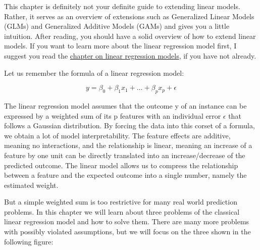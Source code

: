 \documentclass[12pt,]{krantz}
\begin{document}
This chapter is definitely not your definite guide to extending linear
models. Rather, it serves as an overview of extensions such as
Generalized Linear Models (GLMs) and Generalized Additive Models (GAMs)
and gives you a little intuition. After reading, you should have a solid
overview of how to extend linear models. If you want to learn more about
the linear regression model first, I suggest you read the
\protect\hyperlink{limo}{chapter on linear regression models}, if you
have not already.

Let us remember the formula of a linear regression model:

\[y=\beta_{0}+\beta_{1}x_{1}+\ldots+\beta_{p}x_{p}+\epsilon\]

The linear regression model assumes that the outcome y of an instance
can be expressed by a weighted sum of its p features with an individual
error \(\epsilon\) that follows a Gaussian distribution. By forcing the
data into this corset of a formula, we obtain a lot of model
interpretability. The feature effects are additive, meaning no
interactions, and the relationship is linear, meaning an increase of a
feature by one unit can be directly translated into an increase/decrease
of the predicted outcome. The linear model allows us to compress the
relationship between a feature and the expected outcome into a single
number, namely the estimated weight.

But a simple weighted sum is too restrictive for many real world
prediction problems. In this chapter we will learn about three problems
of the classical linear regression model and how to solve them. There
are many more problems with possibly violated assumptions, but we will
focus on the three shown in the following figure:
\end{document}

